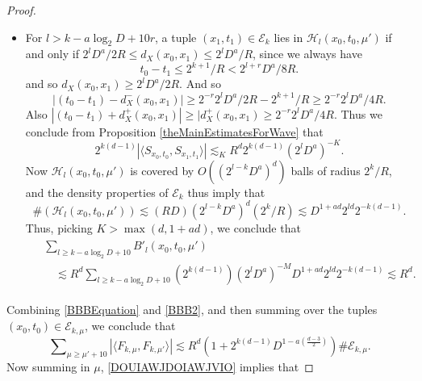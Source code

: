 \begin{proof}
\begin{itemize}
    \item For $l > k - a \log_2 D + 10 r$, a tuple $(x_1,t_1) \in \mathcal{E}_k$ lies in $\mathcal{H}_l(x_0,t_0,\mu')$ if and only if $2^l D^a / 2 R \leq d_X(x_0,x_1) \leq 2^l D^a / R$, since we always have
    \begin{equation}
         t_0 - t_1 \leq 2^{k+1}/R < 2^{l+r} D^a / 8R.
    \end{equation}
    and so $d_X(x_0,x_1) \geq 2^l D^a / 2R$. And so 
    \[ |(t_0 - t_1) - d_X^-(x_0,x_1)| \geq 2^{-r} 2^l D^a / 2R - 2^{k+1} / R \geq 2^{-r} 2^l D^a / 4R. \]
    Also $|(t_0 - t_1) + d_X^+(x_0,x_1)| \geq |d_X^+(x_0,x_1) \geq 2^{-r} 2^l D^a / 4R$. Thus we conclude from Proposition \ref{theMainEstimatesForWave} that
    \begin{equation}
        2^{k(d-1)} |\langle {S\!}_{x_0,t_0}, {S\!}_{x_1,t_1} \rangle| \lesssim_K R^{d} 2^{k(d-1)} (2^l D^a)^{- K}.
    \end{equation}
    Now $\mathcal{H}_l(x_0,t_0,\mu')$ is covered by $O( (2^{l-k} D^a)^d )$ balls of radius $2^k / R$, and the density properties of $\mathcal{E}_k$ thus imply that
    \begin{equation}
        \#(\mathcal{H}_l(x_0,t_0,\mu')) \lesssim (RD) (2^{l-k} D^a)^d ( 2^k / R ) \lesssim D^{1 + ad} 2^{ld} 2^{-k(d-1)}.
    \end{equation}
    Thus, picking $K > \max(d,1+ad)$, we conclude that
    \begin{align} \label{BBB2}
    \begin{split}
        &\sum\nolimits_{l \geq k - a \log_2 D + 10} B'_l(x_0,t_0,\mu')\\
        &\quad \lesssim R^{d} \sum\nolimits_{l \geq k - a \log_2 D + 10} (2^{k(d-1)}) (2^l D^a)^{-M} D^{1 + ad} 2^{ld} 2^{-k(d-1)} \lesssim R^{d}.
    \end{split}
    \end{align}
    \end{itemize}
    Combining \eqref{BBBEquation} and \eqref{BBB2}, and then summing over the tuples $(x_0,t_0) \in \mathcal{E}_{k,\mu}$, we conclude that
    \begin{equation} \label{DOUIAWJDOIAWJVIO}
        \sum\nolimits_{\mu \geq \mu' + 10} |\langle F_{k,\mu}, F_{k,\mu'} \rangle| \lesssim R^{d} \left( 1 + 2^{k(d-1)} D^{1 - a \left( \frac{d-3}{2} \right)} \right) \# \mathcal{E}_{k,\mu}.
    \end{equation}
    Now summing in $\mu$, \eqref{DOUIAWJDOIAWJVIO} implies that

\end{proof}
